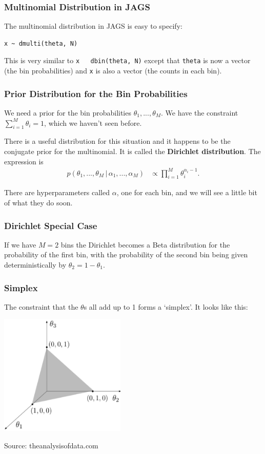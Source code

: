 \documentclass{beamer}
\newcommand{\given}{\,|\,}
\begin{document}
\begin{frame}[fragile]
\frametitle{Multinomial Distribution in JAGS}
The multinomial distribution in JAGS is easy to specify:
\begin{verbatim}
x ~ dmulti(theta, N)
\end{verbatim}
\pause

This is very similar to \texttt{x ~ dbin(theta, N)} except that
\texttt{theta} is now a vector (the bin probabilities) and
\texttt{x} is also a vector (the counts in each bin).

\end{frame}


\begin{frame}[fragile]
\frametitle{Prior Distribution for the Bin Probabilities}
We need a prior for the bin probabilities $\theta_1, ..., \theta_M$.
We have the constraint $\sum_{i=1}^M \theta_i = 1$, which we haven't seen before.\pause

There is a useful distribution for this situation and it happens to be the
conjugate prior for the multinomial. It is called the {\bf Dirichlet distribution}. The expression is
\begin{align}
p(\theta_1, ..., \theta_M \given \alpha_1, ..., \alpha_M)
    &\propto \prod_{i=1}^M \theta_i^{\alpha_i - 1}.
\end{align}
\pause

There are hyperparameters called $\alpha$, one for each bin, and we will
see a little bit of what they do soon.

\end{frame}


\begin{frame}[fragile]
\frametitle{Dirichlet Special Case}
If we have $M=2$ bins the Dirichlet becomes a Beta distribution for the
probability of the first bin, with the probability of the second bin being
given deterministically by $\theta_2 = 1-\theta_1$.

\end{frame}


\begin{frame}[fragile]
\frametitle{Simplex}
The constraint that the $\theta$s all add up to 1 forms a `simplex'. It looks
like this:

\begin{center}
\includegraphics[width=0.45\textwidth]{images/simplex.png}

Source: theanalysisofdata.com
\end{center}

\end{frame}
\end{document}
